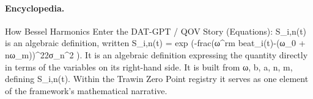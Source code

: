 \paragraph{Encyclopedia.}
How Bessel Harmonics Enter the DAT-GPT / QOV Story (Equations): S\_i,n(t) is an algebraic definition, written S\_i,n(t) = exp (-frac(ω\textasciicircum{}rm beat\_i(t)-(ω\_0 + nω\_m))\textasciicircum{}22σ\_n\textasciicircum{}2 ). It is an algebraic definition expressing the quantity directly in terms of the variables on its right-hand side. It is built from ω, b, a, n, m, defining S\_i,n(t). Within the Trawin Zero Point registry it serves as one element of the framework's mathematical narrative.
